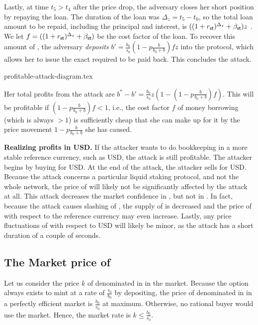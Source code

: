 Lastly, at time $t_5 > t_4$ after the price drop, the adversary closes her short position by repaying the
\stasset loan. The duration of the loan was $\Delta_z = t_5 - t_0$, so the
total loan amount to be repaid, including the principal and interest, is
$((1 + r_{\textsf{st}})^{\Delta_z} + \beta_{\textsf{st}}) z$ \stasset.
We let $f = ((1 + r_{\textsf{st}})^{\Delta_z} + \beta_{\textsf{st}})$ be the cost factor
of the loan.
To recover this amount of \stasset, the adversary \emph{deposits}
$b' = \frac{b_0}{s_0}(1 - p\frac{b}{b_0 + b}) f z$ \asset
into the protocol, which allows her to issue the exact required \stasset
to be paid back. This concludes the attack.

{profitable-attack-diagram.tex}

Her total profits from the attack are
$b^* - b' = \frac{b_0}{s_0}z(1 - (1 - p\frac{b}{b_0 + b}) f)$.
This will be profitable if $(1 - p\frac{b}{b_0 + b}) f < 1$,
i.e., the cost factor $f$ of money borrowing (which is always $> 1$) is
sufficiently cheap that she can make up for it by the price movement
$1 - p\frac{b}{b_0 + b}$ she has caused.

\noindent
\textbf{Realizing profits in USD.}
If the attacker wants to do bookkeeping in a more stable reference currency,
such as USD, the attack is still profitable. The attacker begins by buying
\asset for USD. At the end of the attack, the attacker sells \asset for USD.
Because the attack concerns a particular liquid staking protocol, and
not the whole \asset network, the price of \asset will likely not
be significantly affected by the attack at all.
This attack decreases the market confidence in \stasset,
but not in \asset.
In fact, because
the attack causes slashing of \asset, the supply of \asset is decreased
and the price of \asset with respect to the reference currency may
even increase.
Lastly, any price fluctuations of \asset with respect to USD will likely be
minor, as the attack has a short duration of a couple of seconds.

\subsection{The Market price of \stasset}\label{sec:stasset-price}

Let us consider the price $k$ of \stasset denominated in \asset in the market.
Because the option always exists to mint at a rate of $\frac{s_0}{b_0}$ by
depositing, the price of \stasset denominated in \asset in a perfectly
efficient market is $\frac{b_0}{s_0}$ at maximum. Otherwise, no
rational buyer would use the market. Hence, the market rate is
$k \leq \frac{b_0}{s_0}$.

